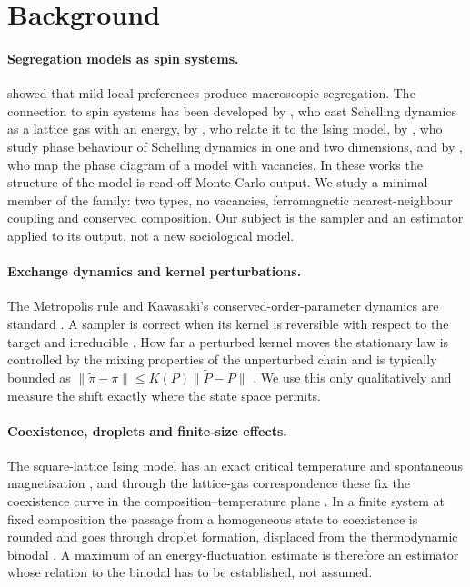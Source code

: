 \section{Background}\label{sec:related}
\paragraph{Segregation models as spin systems.}
\citet{schelling1971} showed that mild local preferences produce macroscopic segregation. The connection to spin systems has been developed by \citet{vinkovic2006}, who cast Schelling dynamics as a lattice gas with an energy, by \citet{stauffer2007}, who relate it to the Ising model, by \citet{dallasta2008}, who study phase behaviour of Schelling dynamics in one and two dimensions, and by \citet{gauvin2009}, who map the phase diagram of a model with vacancies. In these works the structure of the model is read off Monte Carlo output. We study a minimal member of the family: two types, no vacancies, ferromagnetic nearest-neighbour coupling and conserved composition. Our subject is the sampler and an estimator applied to its output, not a new sociological model.

\paragraph{Exchange dynamics and kernel perturbations.}
The Metropolis rule \citep{metropolis1953} and Kawasaki's conserved-order-parameter dynamics \citep{kawasaki1966} are standard \citep{newman1999}. A sampler is correct when its kernel is reversible with respect to the target and irreducible \citep{levin2009}. How far a perturbed kernel moves the stationary law is controlled by the mixing properties of the unperturbed chain and is typically bounded as $\|\tilde\pi-\pi\|\le K(P)\|\tilde P-P\|$ \citep{mitrophanov2005}. We use this only qualitatively and measure the shift exactly where the state space permits.

\paragraph{Coexistence, droplets and finite-size effects.}
The square-lattice Ising model has an exact critical temperature \citep{onsager1944} and spontaneous magnetisation \citep{yang1952}, and through the lattice-gas correspondence these fix the coexistence curve in the composition--temperature plane \citep{rowlinson1982}. In a finite system at fixed composition the passage from a homogeneous state to coexistence is rounded and goes through droplet formation, displaced from the thermodynamic binodal \citep{binder1987,biskup2002}. A maximum of an energy-fluctuation estimate is therefore an estimator whose relation to the binodal has to be established, not assumed.
